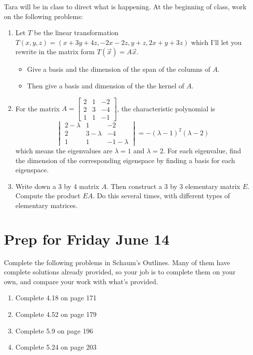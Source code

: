 \documentclass[letterpaper,oneside]{book}%
\theoremstyle{plain}
\theoremstyle{box}
\theoremstyle{problem}
\newtheorem*{hwenum*}{Home Work Practice}
\newenvironment{hw*}[1][]{\begin{hwenum*}[#1]}{\end{hwenum*}\nopagebreak\hrule\bigskip}
\newcommand{\bvec}[1]{\begin{bmatrix} #1 \end{bmatrix}}
\begin{document}
Tara will be in class to direct what is happening. At the beginning of class, work on the following problems:
\begin{enumerate}
 \item Let $T$ be the linear transformation $T(x,y,z)=(x+3y+4z, -2x-2z,y+z,2x+y+3z)$ which I'll let you rewrite in the matrix form $T(\vec x)=A\vec x$. 
 \begin{itemize}
  \item 
 Give a basis and the dimension of the span of the columns of $A$.
\item 
 Then give a basis and dimension of the the kernel of $A$.
 \end{itemize}
 \item 
 For the matrix $A=\bvec{2&1&-2\\2&3&-4\\1&1&-1}$, the characteristic polynomial is $$\begin{vmatrix}2-\lambda&1&-2\\2&3-\lambda&-4\\1&1&-1-\lambda\end{vmatrix}=-(\lambda-1)^2(\lambda-2)$$ which means the eigenvalues are $\lambda=1$ and $\lambda=2$.  For each eigenvalue, find the dimension of the corresponding eigenspace by finding a basis for each eigenspace.
 \item Write down a 3 by 4 matrix $A$. Then construct a 3 by 3 elementary matrix $E$.  Compute the product $EA$. Do this several times, with different types of elementary matrices. 

\end{enumerate}



\section{Prep for Friday June 14}

\begin{hw*}
Complete the following problems in Schaum's Outlines.  Many of them have complete solutions already provided, so your job is to complete them on your own, and compare your work with what's provided.
\begin{enumerate} 
 \item Complete 4.18 on page 171%
 \item Complete 4.52 on page 179 %
 \item Complete 5.9  on page 196 %
 \item Complete 5.24 on page 203 %
\end{enumerate} 
\end{hw*}
\end{document}
